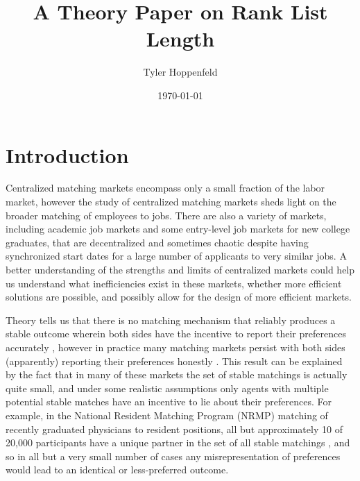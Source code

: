 \documentclass[WP]{AEA}
\begin{document}
\title{A Theory Paper on Rank List Length}
\author{Tyler Hoppenfeld}
\date{\today}
\JEL{}
\Keywords{}


\maketitle


\section{Introduction}

Centralized matching markets  encompass only a small fraction of the labor market, however the study of centralized matching markets  sheds light on the broader matching of employees to jobs. There are also a variety of markets, including academic job markets and some entry-level job markets for new college graduates, that are decentralized and sometimes chaotic despite having synchronized start dates for a large number of applicants to very similar jobs. A better understanding of the strengths and limits of centralized markets could help us understand what inefficiencies exist in these markets, whether more efficient solutions are possible, and possibly allow for the design of more efficient markets. 

Theory tells us that there is no matching mechanism that reliably produces a stable outcome wherein both sides have the incentive to report their preferences accurately \citep{Roth1985}, however in practice many matching markets persist with both sides (apparently) reporting their preferences honestly  \citep{Roth1991}. This result can be explained by the fact that in many of these markets the set of stable matchings is actually quite small, and under some realistic assumptions only agents with multiple potential stable matches have an incentive to lie about their preferences.  For example, in the National Resident Matching Program (NRMP) matching of recently graduated physicians to resident positions, all but approximately 10 of 20,000 participants have a unique partner in the set of all stable matchings \citep{Roth1999a}, and so in all but a very small number of cases any misrepresentation of preferences would lead to an identical or less-preferred outcome. 
\end{document}
